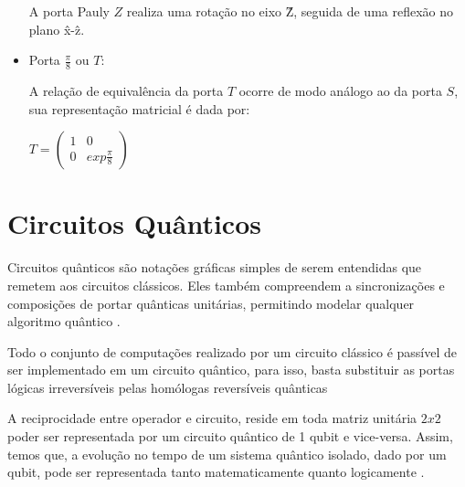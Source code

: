 \documentclass[tcc,capa]{texufpel}
\begin{document}
\begin{itemize}
A porta Pauly $Z$ realiza uma rotação no eixo \^{Z}, seguida de uma reflexão no plano \^{x}-\^{z}. 


\item \begin{center}
    
 Porta $\frac{\pi}{8}$ ou $T$: \cite{chuang00a}
\end{center}

A relação de equivalência da porta $T$ ocorre de modo análogo ao da porta $S$, sua representação matricial é dada por: 

\begin{center}
    
 $T= \left( \begin{array}{cc}
    1 & 0 \\
    0 & exp\frac{\pi}{8}
\end{array}
\right)
$
\end{center}

\end{itemize}


\section{Circuitos Quânticos}
Circuitos quânticos são notações gráficas simples de serem entendidas que remetem aos circuitos clássicos. Eles também compreendem a sincronizações e composições de portar quânticas unitárias, permitindo modelar qualquer algoritmo quântico \cite{MARON10b}.

Todo o conjunto de computações realizado por um circuito clássico é passível de ser implementado em um circuito quântico, para isso, basta substituir as portas lógicas irreversíveis pelas homólogas reversíveis quânticas \cite{portugal2004introduccaoa}

A reciprocidade entre operador e circuito, reside em toda matriz unitária $2 x 2$ poder ser representada por um circuito quântico de 1 qubit e vice-versa. Assim, temos que, a evolução no tempo de um sistema quântico isolado, dado por um qubit, pode ser representada tanto matematicamente quanto logicamente \cite{imre2005quantum}.
\end{document}
